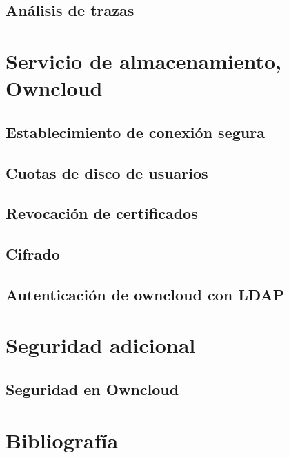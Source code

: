 \documentclass[a4paper]{article}
\begin{document}
\subsection{Análisis de trazas}

\section{Servicio de almacenamiento, Owncloud}
\subsection{Establecimiento de conexión segura}
\subsection{Cuotas de disco de usuarios}
\subsection{Revocación de certificados}
\subsection{Cifrado}
\subsection{Autenticación de owncloud con LDAP}

\section{Seguridad adicional}
\subsection{Seguridad en Owncloud}

\section{Bibliografía}
\backmatter
\nocite{*}

\end{document}
